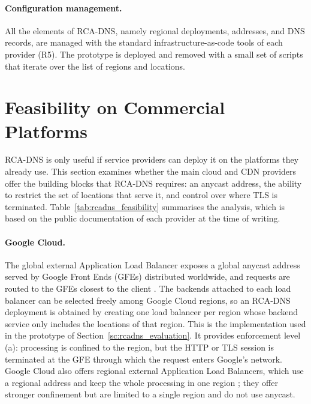 \documentclass[
A4paper,                %
twoside,                %
openright,              %
chapterprefix=true,     %
12pt,                   %
headings=normal,        %
titlepage=on            %
]{book}
\begin{document}
\paragraph{Configuration management.} All the elements of RCA-DNS, namely regional deployments, addresses, and DNS records, are managed with the standard infrastructure-as-code tools of each provider (R5). The prototype is deployed and removed with a small set of scripts that iterate over the list of regions and locations.

\section{Feasibility on Commercial Platforms}
\label{sc:rcadns_feasibility}

RCA-DNS is only useful if service providers can deploy it on the platforms they already use. This section examines whether the main cloud and CDN providers offer the building blocks that RCA-DNS requires: an anycast address, the ability to restrict the set of locations that serve it, and control over where TLS is terminated. Table~\ref{tab:rcadns_feasibility} summarises the analysis, which is based on the public documentation of each provider at the time of writing.

\paragraph{Google Cloud.} The global external Application Load Balancer exposes a global anycast address served by Google Front Ends (GFEs) distributed worldwide, and requests are routed to the GFEs closest to the client \cite{ApplicationDocumentation, ForwardingDocumentation}. The backends attached to each load balancer can be selected freely among Google Cloud regions, so an RCA-DNS deployment is obtained by creating one load balancer per region whose backend service only includes the locations of that region. This is the implementation used in the prototype of Section~\ref{sc:rcadns_evaluation}. It provides enforcement level (a): processing is confined to the region, but the HTTP or TLS session is terminated at the GFE through which the request enters Google's network. Google Cloud also offers regional external Application Load Balancers, which use a regional address and keep the whole processing in one region \cite{ForwardingDocumentation}; they offer stronger confinement but are limited to a single region and do not use anycast.
\end{document}
